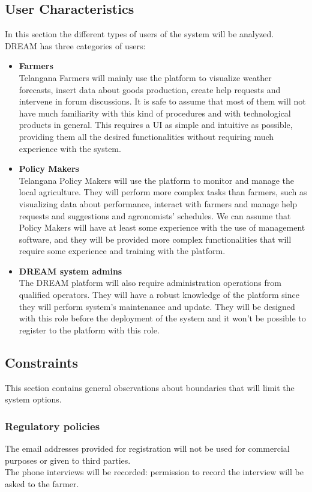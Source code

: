 \documentclass[10pt]{article}
\begin{document}
\subsection{User Characteristics}
In this section the different types of users of the system will be analyzed. DREAM has three categories of users:
\begin{itemize}
    \item \textbf{Farmers}\\
    Telangana Farmers will mainly use the platform to visualize weather forecasts, insert data about goods production, create help requests and intervene
    in forum discussions. It is safe to assume that most of them will not have much familiarity with this kind of procedures and with
    technological products in general. This requires a UI as simple and intuitive as possible, providing them all the desired functionalities
    without requiring much experience with the system. 
    \item \textbf{Policy Makers}\\
    Telangana Policy Makers will use the platform to monitor and manage the local agriculture. They will perform more complex tasks than farmers, such as 
    visualizing data about performance, interact with farmers and manage help requests and suggestions and agronomists' schedules. We can assume that Policy
    Makers will have at least some experience with the use of management software, and they will be provided more complex functionalities that will require 
    some experience and training with the platform.
    \item \textbf{DREAM system admins}\\
    The DREAM platform will also require administration operations from qualified operators. They will have a robust knowledge of the platform since they will 
    perform system's maintenance and update. They will be designed with this role before the deployment of the system and it won't be possible to register to the 
    platform with this role. 
\end{itemize} 
\subsection{Constraints}
This section contains general observations about boundaries that will limit the system options.
\subsubsection{Regulatory policies}
The email addresses provided for registration will not be used for commercial purposes or given to third parties.\\
The phone interviews will be recorded: permission to record the interview will be asked to the farmer.
\end{document}
